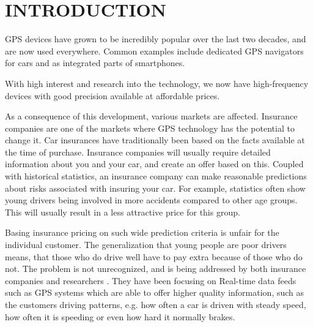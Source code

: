\section{INTRODUCTION}
\label{sec:intro}

GPS devices have grown to be incredibly popular over the last two decades, and are now used everywhere. Common examples include dedicated GPS navigators for cars and as integrated parts of smartphones.

With high interest and research into the technology, we now have high-frequency devices with good precision available at affordable prices.\cite{art:telematicsmatter}

As a consequence of this development, various markets are affected. Insurance companies are one of the markets where GPS technology has the potential to change it. Car insurances have traditionally been based on the facts available at the time of purchase. Insurance companies will usually require detailed information about you and your car, and create an offer based on this. Coupled with historical statistics, an insurance company can make reasonable predictions about risks associated with insuring your car. For example, statistics often show young drivers being involved in more accidents compared to other age groups\cite{accidents}\cite{url:forbes}. This will usually result in a less attractive price for this group.

Basing insurance pricing on such wide prediction criteria is unfair for the individual customer. The generalization that young people are poor drivers means, that those who do drive well have to pay extra because of those who do not. The problem is not unrecognized, and is being addressed by both insurance companies and researchers \cite{mar:ubi16}. They have been focusing on Real-time data feeds such as GPS systems which are able to offer higher quality information, such as the customers driving patterns, e.g. how often a car is driven with steady speed, how often it is speeding or even how hard it normally brakes.
%

